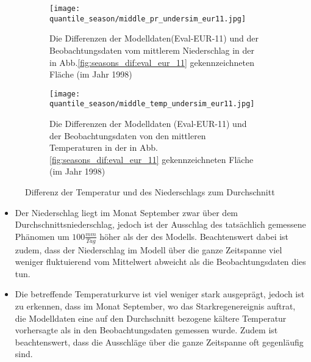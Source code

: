 \begin{figure}[h]
	\begin{subfigure}{0.49\textwidth}
		\texttt{[image: quantile\_season/middle\_pr\_undersim\_eur11.jpg]}
		\caption{Die Differenzen der Modelldaten(Eval-EUR-11) und der Beobachtungsdaten vom mittlerem Niederschlag in der in Abb.\ref{fig:seasons_dif:eval_eur_11} gekennzeichneten Fläche (im Jahr 1998)}
	\end{subfigure}
	\begin{subfigure}{0.49\textwidth}
		\texttt{[image: quantile\_season/middle\_temp\_undersim\_eur11.jpg]}
		\caption{Die Differenzen der Modelldaten (Eval-EUR-11) und der Beobachtungsdaten von den mittleren Temperaturen in der in Abb.\ref{fig:seasons_dif:eval_eur_11} gekennzeichneten Fläche (im Jahr 1998)}
	\end{subfigure}
	\caption{Differenz der Temperatur und des Niederschlags zum Durchschnitt}
	\label{fig:seasons:undersim_eval_eur11}
\end{figure}
\begin{itemize}
	\item Der Niederschlag liegt im Monat September zwar über dem Durchschnittsniederschlag, jedoch ist der Ausschlag des tatsächlich gemessene Phänomen um $100\frac{mm}{Tag}$ höher als der des Modells. Beachtenswert dabei ist zudem, dass der Niederschlag im Modell über die ganze Zeitspanne viel weniger fluktuierend vom Mittelwert abweicht als die Beobachtungsdaten dies tun.
	\item Die betreffende Temperaturkurve ist viel weniger stark ausgeprägt, jedoch ist zu erkennen, dass im Monat September, wo das Starkregenereignis auftrat, die Modelldaten eine auf den Durchschnitt bezogene kältere Temperatur vorhersagte als in den Beobachtungsdaten gemessen wurde. Zudem ist beachtenswert, dass die Ausschläge über die ganze Zeitspanne oft gegenläufig sind.
\end{itemize}

